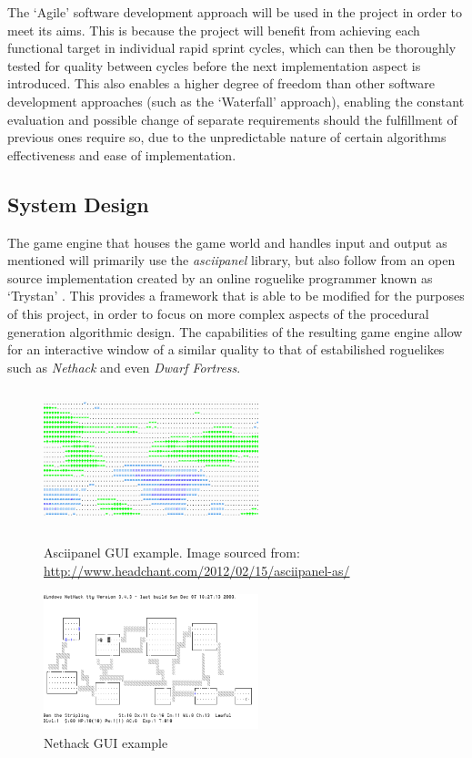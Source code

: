 \documentclass[12pt,a4paper]{article}
\begin{document}
The `Agile' software development approach will be used in the project in order to meet its aims. This is because the project will benefit from achieving each functional target in individual rapid sprint cycles, which can then be thoroughly tested for quality between cycles before the next implementation aspect is introduced. This also enables a higher degree of freedom than other software development approaches (such as the `Waterfall' approach), enabling the constant evaluation and possible change of separate requirements should the fulfillment of previous ones require so, due to the unpredictable nature of certain algorithms effectiveness and ease of implementation.


\subsection{System Design}

The game engine that houses the game world and handles input and output as mentioned will primarily use the \emph{asciipanel} library, but also follow from an open source implementation created by an online roguelike programmer known as `Trystan' \cite{trystan}. This provides a framework that is able to be modified for the purposes of this project, in order to focus on more complex aspects of the procedural generation algorithmic design. The capabilities of the resulting game engine allow for an interactive window of a similar quality to that of estabilished roguelikes such as \emph{Nethack} and even \emph{Dwarf Fortress}. 



\begin{figure}
\centering
 	\includegraphics[width=6.25cm,height=4cm]{images/asciipanel1inv.png}
	\caption[]{Asciipanel GUI example. Image sourced from: \url{http://www.headchant.com/2012/02/15/asciipanel-as/}}
	\label{fig:fig1}
	\vspace{2ex}
	\includegraphics[width=6.25cm, height=4cm]{images/nethack2.png}
  \caption[]{Nethack GUI example}
  \label{fig:fig2}
 \end{figure}
\end{document}
